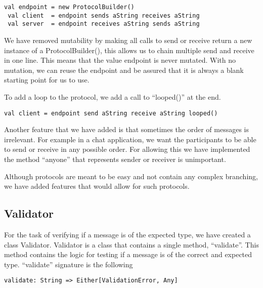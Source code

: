 \begin{lstlisting}[style=myScalastyle]
 val endpoint = new ProtocolBuilder()
 val client  = endpoint sends aString receives aString
 val server  = endpoint receives aString sends aString
\end{lstlisting}
We have removed mutability by making all calls to send or receive return a new instance of a ProtocolBuilder(), this allows us to chain multiple send and receive in one line. This means that the value endpoint is never mutated. With no mutation, we can reuse the endpoint and be assured that it is always a blank starting point for us to use.

To add a loop to the protocol, we add a call to ``looped()'' at the end.
\begin{lstlisting}[style=myScalastyle]
 val client = endpoint send aString receive aString looped()
\end{lstlisting}

Another feature that we have added is that sometimes the order of messages is irrelevant. For example in a chat application, we want the participants to be able to send or receive in any possible order. For allowing this we have implemented the method ``anyone'' that represents sender or receiver is unimportant.

Although protocols are meant to be easy and not contain any complex branching, we have added features that would allow for such protocols.

\subsection{Validator}
\label{sec:validator}
For the task of verifying if a message is of the expected type, we have created a class Validator. Validator is a class that contains a single method, ``validate''. This method contains the logic for testing if a message is of the correct and expected type. ``validate'' signature is the following
\begin{lstlisting}[style=myScalastyle]
    validate: String => Either[ValidationError, Any]
\end{lstlisting}

